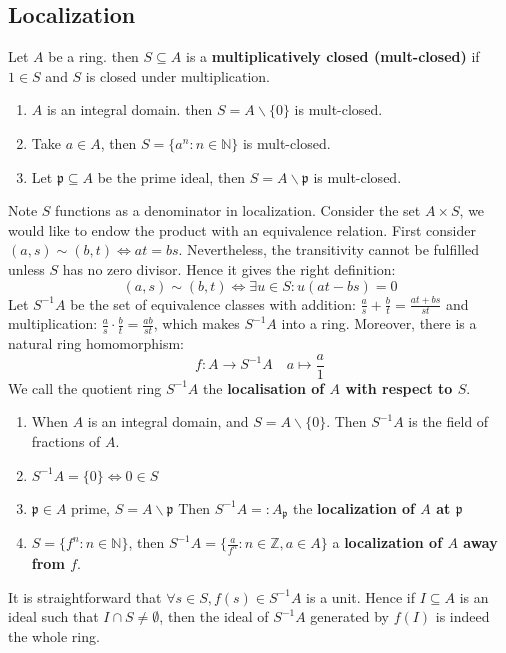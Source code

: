 \documentclass[12pt]{article}
\theoremstyle{definition}
\theoremstyle{plain}
\newcommand{\nat}{\mathbb{N}}
\newcommand{\z}{\mathbb{Z}}
\begin{document}
\subsection{Localization}
\Def Let $A$ be a ring. then $S\subseteq A$ is a \textbf{multiplicatively closed (mult-closed)} if $1\in S$ and $S$ is closed under multiplication.
\Exe \leavevmode
\begin{enumerate}
  \item $A$ is an integral domain. then $S=A\backslash \{0\}$ is mult-closed.
  \item Take $a\in A$, then $S=\{a^n: n\in \nat\}$ is mult-closed.
  \item Let $\mathfrak{p}\subseteq A$ be the prime ideal, then $S=A\backslash \mathfrak{p}$ is mult-closed.
\end{enumerate}
Note $S$ functions as a denominator in localization.
\Rmk Consider the set $A\times S$, we would like to endow the product with an equivalence relation. First consider $(a, s)\sim (b, t) \iff at=bs$. Nevertheless, the transitivity cannot be fulfilled unless $S$ has no zero divisor. Hence it gives the right definition:
$$(a, s)\sim ( b, t) \iff \exists u\in S: u(at-bs)=0$$
\Def Let $S^{-1}A$ be the set of equivalence classes with addition: $\frac{a}{s}+\frac{b}{t}=\frac{at+bs}{st}$ and multiplication: $\frac{a}{s}\cdot \frac{b}{t}=\frac{ab}{st}$, which makes $S^{-1}A$ into a ring. Moreover, there is a natural ring homomorphism:
$$f:A\to S^{-1}A \quad a\mapsto \frac{a}{1}$$
We call the quotient ring $S^{-1}A$ the \textbf{localisation of $A$ with respect to $S$}.
\Exe \leavevmode
\begin{enumerate}
  \item When $A$ is an integral domain, and $S=A\backslash \{0\}$. Then $S^{-1}A$ is the field of fractions of $A$.
  \item $S^{-1}A=\{0\} \iff 0\in S$
  \item $\mathfrak{p}\in A$ prime, $S=A\backslash \mathfrak{p}$ Then $S^{-1}A=:A_\mathfrak{p}$ the \textbf{localization of $A$ at $\mathfrak{p}$}
  \item $S=\{f^n: n\in \nat\}$, then $S^{-1}A=\{\frac{a}{f^n}:n\in \z, a\in A\}$ a \textbf{localization of $A$ away from $f$}.
\end{enumerate}
\Rmk It is straightforward that $\forall s\in S, f(s)\in S^{-1}A$ is a unit. Hence if $I\subseteq A$ is an ideal such that $I\cap S\neq \emptyset$, then the ideal of $S^{-1}A$ generated by $f(I)$ is indeed the whole ring.
\end{document}
